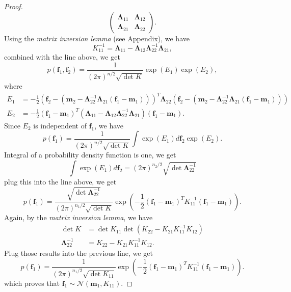 \documentclass[12pt,a4paper]{article}
\theoremstyle{definition}
\numberwithin{equation}{section}
\let\vec\mathbf
\begin{document}
\begin{proof}
\begin{equation*}
	\begin{pmatrix}
	\vec\Lambda_{11} & \vec\Lambda_{12}\\
	\vec\Lambda_{21} & \vec\Lambda_{22}
	\end{pmatrix}.
	\end{equation*}
	Using the \textit{matrix inversion lemma} (see Appendix), we have
	\begin{equation*} \label{}
	K_{11}^{-1} = \vec\Lambda_{11}-\vec\Lambda_{12}\vec\Lambda_{22}^{-1}\vec\Lambda_{21},
	\end{equation*}
	combined with the line above, we get
	\begin{equation*} \label{}
	p(\vec f_1,\vec f_2) = \frac{1}{(2\pi)^{n/2}\sqrt{\det K}}\exp{(E_1)}\exp{(E_2)},
	\end{equation*}
	where
	\begin{equation*} \label{}
	\begin{split}
	E_1 &=-\frac{1}{2}\left(\vec f_2-(\vec m_2 - \vec\Lambda_{22}^{-1} \vec\Lambda_{21}(\vec f_1 - \vec m_1))\right)^T\vec\Lambda_{22}\left(\vec f_2-(\vec m_2 - \vec\Lambda_{22}^{-1} \vec\Lambda_{21}(\vec f_1 - \vec m_1))\right)\\
	E_2 & = -\frac{1}{2}\left(\vec f_1 - \vec m_1\right)^T\left(\vec\Lambda_{11}-\vec\Lambda_{12}\vec\Lambda_{22}^{-1}\vec\Lambda_{21}\right)\left(\vec f_1 - \vec m _1 \right).
	\end{split}
	\end{equation*}
	Since $E_2$ is independent of $\vec f_1$, we have
	\begin{equation*} \label{}
	p(\vec f_1) = \frac{1}{(2\pi)^{n/2}\sqrt{\det K}}\int \exp{(E_1)}d\vec f_2\exp{(E_2)}.
	\end{equation*}
	Integral of a probability density function is one, we get
	\begin{equation*} \label{}
	\int \exp{(E_1)}d\vec f_2 = (2\pi)^{n_2/2}\sqrt{\det \vec \Lambda_{22}^{-1}}
	\end{equation*}
	plug this into the line above, we get
	\begin{equation*} \label{}
	p(\vec f_1) = \frac{\sqrt{\det \vec \Lambda_{22}^{-1}}}{(2\pi)^{n_1/2}\sqrt{\det K}} \exp{\left(-\frac{1}{2}\left(\vec f_1 - \vec m_1\right)^TK_{11}^{-1}\left(\vec f_1 - \vec m _1 \right)\right)}.
	\end{equation*}
	Again, by the \textit{matrix inversion lemma}, we have
	\begin{equation*} \label{}
	\begin{split}
	\det K&= \det K_{11}\det(K_{22}-K_{21}K_{11}^{-1}K_{12})\\
	\vec \Lambda_{22}^{-1} &= K_{22}-K_{21}K_{11}^{-1}K_{12}.
	\end{split}
	\end{equation*}
	Plug those results into the previous line, we get
	\begin{equation*} \label{}
	p(\vec f_1) = \frac{1}{(2\pi)^{n_1/2}\sqrt{\det K_{11}}} \exp{\left(-\frac{1}{2}\left(\vec f_1 - \vec m_1\right)^TK_{11}^{-1}\left(\vec f_1 - \vec m _1 \right)\right)}.
	\end{equation*}
	which proves that $\vec f_1\sim\mathcal{N}(\vec m_1,K_{11})$.
\end{proof}
\end{document}
